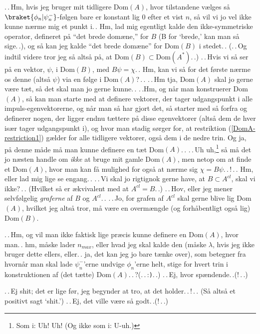 \documentclass{report}
\begin{document}
.\,.\,Hm, hvis jeg bruger mit tidligere Dom$(A)$, hvor tilstandene vælges så $\braket{\phi_n| \psi_n^-}$-følgen bare er konstant lig 0 efter et vist $n$, så vil vi jo vel ikke kunne nærme mig et punkt i.\,. Hm, lad mig egentligt kalde den ikke-symmetriske operator, defineret på ``det brede domæne,'' for $B$ (B for `brede,' kan man så sige.\,.), og så kan jeg kalde ``det brede domæne'' for Dom$(B)$ i stedet.\,. (.\,.\,Og indtil videre tror jeg så altså på, at $\mathrm{Dom}(B) \subset \mathrm{Dom}(A^*)$.\,.) .\,.\,Hvis vi så ser på en vektor, $\psi$, i Dom$(B)$, med $B\psi = \chi$.\,. Hm, kan vi så for det første nærme os denne (altså $\psi$) via en følge i Dom$(A)$?\,.\,. .\,.\,Hm tja, Dom$(A)$ skal jo gerne være tæt, så det skal man jo gerne kunne.\,. .\,.Hm, og når man konstruerer Dom$(A)$, så kan man starte med at definere vektorer, der tager udgangspunkt i alle impuls-egenvektorerne, og når man så har gjort det, så starter med så forfra og definerer nogen, der ligger endnu tættere på disse egenvektorer (altså dem de hver især tager udgangspunkt i), og hvor man stadig sørger for, at restriktion (\ref{DomA-restriction1}) gælder for alle tidligere vektorer, også dem i de nedre trin. Og ja, på denne måde må man kunne definere en tæt Dom$(A)$.\,. .\,.\,Uh uh,\footnote{Som i: Uh! Uh! (Og ikke som i: U-uh.)} så må det jo næsten handle om \emph{ikke} at bruge mit gamle Dom$(A)$, men netop om at finde et Dom$(A)$, hvor man kan få mulighed for også at nærme sig $\chi = B \psi$.\,.\,!\,.\,. Hm, eller lad mig lige se engang.\,. .\,.\,Vi skal jo rigtignok gerne have, at $B \subset A^{cl}$, skal vi ikke?\,.\,. (Hvilket så er ækvivalent med at $A^{cl}=B$.\,.) .\,.\,Hov, eller jeg mener selvfølgelig \emph{graferne} af $B$ og $A^{cl}$.\,. .\,.\,Jo, for grafen af $A^{cl}$ skal gerne blive lig Dom$(A)$, hvilket jeg altså tror, må være en overmængde (og forhåbentligt også lig) Dom$(B)$. 

.\,.\,Hm, og vil man ikke faktisk lige præcis kunne definere en Dom$(A)$, hvor man.\,. hm, måske lader $n_{max}$, eller hvad jeg skal kalde den (måske $\lambda$, hvis jeg ikke bruger dette ellers, eller.\,. ja, det kan jeg jo bare tænke over), som betegner fra hvornår man skal lade $\psi_n^-$'erne undvige $\phi_n$'erne helt, stige for hvert trin i konstruktionen af (det tætte) Dom$(A)$.\,.\,?(.\,.\,:\texttt).\,.) .\,.\,Ej, hvor spændende.\,.(!\,.\,.)

.\,.\,Ej shit; det er lige før, jeg begynder at tro, at det holder.\,.\,!\,.\,. (Så altså et positivt sagt `shit.') .\,.\,Ej, det ville være så godt.\,.(!\,.\,.)
\end{document}
